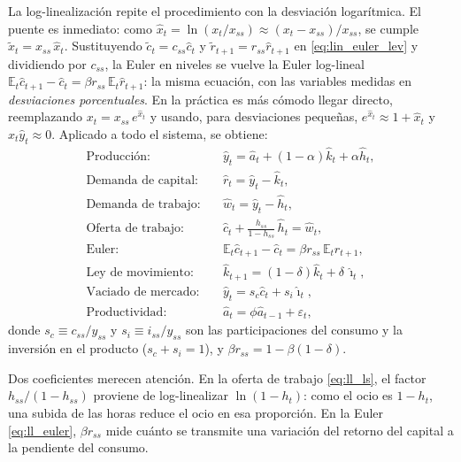 \documentclass[11pt,a4paper]{report}
\newcounter{tcbrem}[section]
\renewcommand{\thetcbrem}{\thesection.\arabic{tcbrem}}
\newenvironment{remark}{%
  \refstepcounter{tcbrem}%
  \begin{tcolorbox}[remarkstyle, title={Observación~\thetcbrem}]}%
{\end{tcolorbox}}
\newcommand{\E}{\mathbb{E}}
\begin{document}
La log-linealización repite el procedimiento con la desviación logarítmica. El puente
es inmediato: como $\hat{x}_t=\ln(x_t/x_{ss})\approx (x_t-x_{ss})/x_{ss}$, se cumple
$\tilde{x}_t=x_{ss}\,\hat{x}_t$. Sustituyendo $\tilde{c}_t=c_{ss}\hat{c}_t$ y
$\tilde{r}_{t+1}=r_{ss}\hat{r}_{t+1}$ en \eqref{eq:lin_euler_lev} y dividiendo por
$c_{ss}$, la Euler en niveles se vuelve la Euler log-lineal
$\E_t\hat{c}_{t+1}-\hat{c}_t=\beta r_{ss}\,\E_t\hat{r}_{t+1}$: la misma ecuación, con
las variables medidas en \emph{desviaciones porcentuales}. En la práctica es más
cómodo llegar directo, reemplazando $x_t=x_{ss}\,e^{\hat{x}_t}$ y usando, para
desviaciones pequeñas, $e^{\hat{x}_t}\approx 1+\hat{x}_t$ y $\hat{x}_t\hat{y}_t\approx 0$.
Aplicado a todo el sistema, se obtiene:
\begin{align}
\text{Producción:}&\quad \hat{y}_t=\hat{a}_t+(1-\alpha)\hat{k}_t+\alpha\hat{h}_t, \label{eq:ll_prod}\\
\text{Demanda de capital:}&\quad \hat{r}_t=\hat{y}_t-\hat{k}_t, \label{eq:ll_kd}\\
\text{Demanda de trabajo:}&\quad \hat{w}_t=\hat{y}_t-\hat{h}_t, \label{eq:ll_ld}\\
\text{Oferta de trabajo:}&\quad \hat{c}_t+\tfrac{h_{ss}}{1-h_{ss}}\,\hat{h}_t=\hat{w}_t, \label{eq:ll_ls}\\
\text{Euler:}&\quad \E_t\hat{c}_{t+1}-\hat{c}_t=\beta r_{ss}\,\E_t\hat{r}_{t+1}, \label{eq:ll_euler}\\
\text{Ley de movimiento:}&\quad \hat{k}_{t+1}=(1-\delta)\hat{k}_t+\delta\,\hat{\imath}_t, \label{eq:ll_lom}\\
\text{Vaciado de mercado:}&\quad \hat{y}_t=s_c\hat{c}_t+s_i\hat{\imath}_t, \label{eq:ll_clear}\\
\text{Productividad:}&\quad \hat{a}_t=\phi\hat{a}_{t-1}+\varepsilon_t, \label{eq:ll_tfp}
\end{align}
donde $s_c\equiv c_{ss}/y_{ss}$ y $s_i\equiv i_{ss}/y_{ss}$ son las
participaciones del consumo y la inversión en el producto ($s_c+s_i=1$), y
$\beta r_{ss}=1-\beta(1-\delta)$.

\begin{remark}
Dos coeficientes merecen atención. En la oferta de trabajo \eqref{eq:ll_ls}, el
factor $h_{ss}/(1-h_{ss})$ proviene de log-linealizar $\ln(1-h_t)$: como el ocio
es $1-h_t$, una subida de las horas reduce el ocio en esa proporción. En la
Euler \eqref{eq:ll_euler}, $\beta r_{ss}$ mide cuánto se transmite una variación
del retorno del capital a la pendiente del consumo.
\end{remark}
\end{document}
